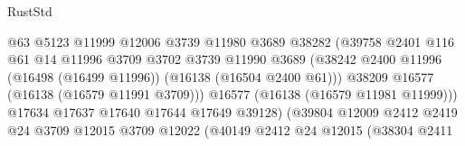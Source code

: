 \begin{lexlean}{RustStd}
\begin{coremodule}
                                            @63
                                            @5123
                                            @11999
                                            @12006
                                            @3739
                                            @11980
                                            @3689
                                            @38282
                                            (@39758
                                              @2401
                                              @116
                                              @61
                                              @14
                                              @11996
                                              @3709
                                              @3702
                                              @3739
                                              @11990
                                              @3689
                                              (@38242
                                                @2400
                                                @11996
                                                (@16498 (@16499 @11996))
                                                (@16138 (@16504 @2400 @61)))
                                              @38209
                                              @16577
                                              (@16138 (@16579 @11991 @3709)))
                                            @16577
                                            (@16138 (@16579 @11981 @11999)))
                                          @17634
                                          @17637
                                          @17640
                                          @17644
                                          @17649
                                          @39128)
                                        (@39804
                                          @12009
                                          @2412
                                          @2419
                                          @24
                                          @3709
                                          @12015
                                          @3709
                                          @12022
                                          (@40149
                                            @2412
                                            @24
                                            @12015
                                            (@38304
                                              @2411

\end{coremodule}
\end{lexlean}

